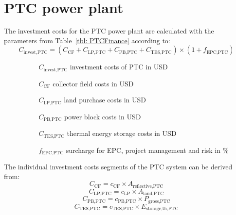 \section{PTC power plant}
The investment costs for the PTC power plant are calculated with the parameters from Table~\ref{tbl: PTCFinance} according to:
\begin{equation}
C_{\text{invest,PTC}} = (C_{\text{CF}}+C_{\text{LP,PTC}}+C_{\text{PB,PTC}}+C_{\text{TES,PTC}})\times(1+f_{\text{EPC,PTC}}) \label{GL_CRInvest}
\end{equation} 
\begin{itemize}
\item[ ] 
\begin{itemize}
\item[ ] 
\begin{itemize}
\item[$C_{\text{invest,PTC}}$]investment costs of PTC in USD
\item[$C_{\text{CF}}$]collector field costs in USD
\item[$C_{\text{LP,PTC}}$]land purchase costs in USD
\item[$C_{\text{PB,PTC}}$]power block costs in USD
\item[$C_{\text{TES,PTC}}$]thermal energy storage costs in USD
\item[$f_{\text{EPC,PTC}}$]surcharge for EPC, project management and risk in \%
\end{itemize}
\end{itemize}
\end{itemize}
The individual investment costs segments of the PTC system can be derived from:
\begin{equation}
C_{\text{CF}} = c_{\text{CF}} \times A_{\text{reflective,PTC}}
\end{equation} 
\begin{equation}
C_{\text{LP,PTC}} = c_{\text{LP}} \times A_{\text{land,PTC}}
\end{equation} 
\begin{equation}
C_{\text{PB,PTC}} = c_{\text{PB,PTC}} \times P_{\text{gross,PTC}}
\end{equation} 
\begin{equation}
C_{\text{TES,PTC}} = c_{\text{TES,PTC}} \times E_{\text{storage,th,PTC}}
\end{equation} 
